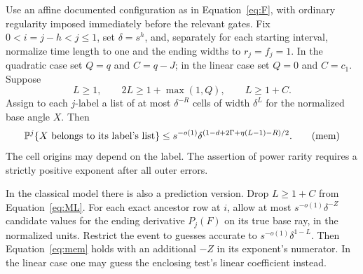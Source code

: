 \begin{lemma}\label{low:memory}
Use an affine documented configuration as in Equation~\eqref{eq:F},
with ordinary regularity imposed immediately before the relevant gates.
Fix $0<i=j-h<j\leq1$, set $\delta=s^h$, and, separately for each starting
interval, normalize time length to one and the ending widths to
$r_j=f_j=1$. In the quadratic case set $Q=q$ and $C=q-J$; in the linear
case set $Q=0$ and $C=c_1$. Suppose
\begin{equation}
 L\geq1,\qquad 2L\geq1+\max(1,Q),\qquad L\geq1+C.
 \tag{ML}\label{eq:ML}
\end{equation}
Assign to each $j$-label a list of at most $\delta^{-R}$ cells of width
$\delta^L$ for the normalized base angle $X$. Then
\begin{equation}
 \mathbb P^j\{X\text{ belongs to its label's list}\}
 \leq s^{-o(1)}
       \delta^{(1-d+2\Gamma+\eta(L-1)-R)/2}.
 \tag{mem}\label{eq:mem}
\end{equation}
The cell origins may depend on the label. The assertion of power rarity
requires a strictly positive exponent after all outer errors.

In the classical model there is also a prediction version. Drop
$L\geq1+C$ from Equation~\eqref{eq:ML}. For each exact ancestor row at
$i$, allow at most $s^{-o(1)}\delta^{-Z}$ candidate values for the ending
derivative $P_j(F)$ on its true base ray, in the normalized units. Restrict
the event to guesses accurate to $s^{-o(1)}\delta^{1-L}$. Then
Equation~\eqref{eq:mem} holds with an additional $-Z$ in its exponent's
numerator. In the linear case one may guess the enclosing test's linear
coefficient instead.
\end{lemma}


